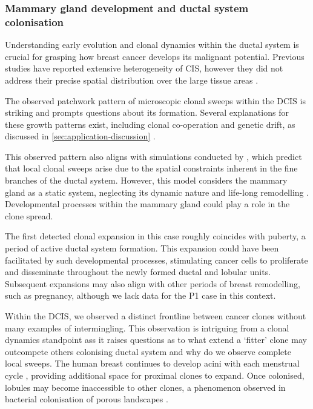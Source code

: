 
\subsubsection*{Mammary gland development and ductal system colonisation}

Understanding early evolution and clonal dynamics within the ductal system is crucial for grasping how breast cancer develops its malignant potential. Previous studies have reported extensive heterogeneity of \acl{CIS}, however they did not address their precise spatial distribution over the large tissue areas \parencite{Casasent2018-gx,Nishimura2023-mk,Yates2015-xk}. 

The observed patchwork pattern of microscopic clonal sweeps within the \ac{DCIS} is striking and prompts questions about its formation. Several explanations for these growth patterns exist, including clonal co-operation and genetic drift, as discussed in \cref{sec:application-discussion} \parencite{Janiszewska2019-zq,Turajlic2019-sr}.

This observed pattern also aligns with simulations conducted by \textcite{West2021-ar}, which predict that local clonal sweeps arise due to the spatial constraints inherent in the fine branches of the ductal system. However, this model considers the mammary gland as a static system, neglecting its dynamic nature and life-long remodelling . Developmental processes within the mammary gland could play a role in the clone spread.

The first detected clonal expansion in this case roughly coincides with puberty, a period of active ductal system formation. This expansion could have been facilitated by such developmental processes, stimulating cancer cells to proliferate and disseminate throughout the newly formed ductal and lobular units. Subsequent expansions may also align with other periods of breast remodelling, such as pregnancy, although we lack data for the P1 case in this context.

Within the \ac{DCIS}, we observed a distinct frontline between cancer clones without many examples of intermingling. This observation is intriguing from a clonal dynamics standpoint ass it raises questions as to what extend a `fitter' clone may outcompete others colonising ductal system and why do we observe complete local sweeps. The human breast continues to develop acini with each menstrual cycle \parencite{Javed2013-ew}, providing additional space for proximal clones to expand. Once colonised, lobules may become inaccessible to other clones, a phenomenon observed in bacterial colonisation of porous landscapes \parencite{Conwill2022-sp}.

